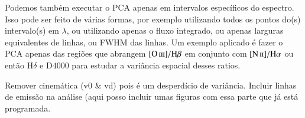 Podemos também executar o PCA apenas em intervalos específicos do espectro. Isso pode ser feito de várias formas, por
exemplo utilizando todos os pontos do(s) intervalo(s) em $\lambda$, ou utilizando apenas o fluxo integrado, ou apenas
larguras equivalentes de linhas, ou FWHM das linhas. Um exemplo aplicado é fazer o PCA apenas das regiões que abrangem
$\oIII/\Hbeta$ em conjunto com $\nII/\Halpha$ ou então $\mathrm{H}\delta$ e D$4000$ para estudar a variância espacial
desses ratios.


\ojo
Remover cinemática (v0 \& vd) pois é um desperdício de variância.
Incluir linhas de emissão na análise (aqui posso incluir umas figuras 
com essa parte que já está programada.

